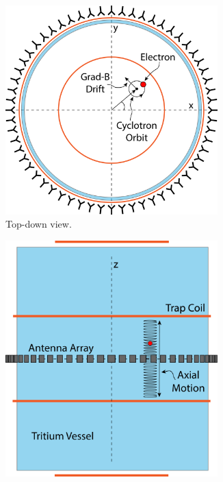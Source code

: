 \begin{figure}[h]
    \centering
    \begin{subfigure}{0.48\textwidth}
        \centering
        \includegraphics[width=0.9\textwidth]{figs/Chapter-4/230328_deepfilter_paper_apparatus_concept_top_v2.png}
        \caption{Top-down view.}
        \label{fig:apparatus_concept_top}
    \end{subfigure}
    \begin{subfigure}{0.48\textwidth}
        \centering
        \includegraphics[width=0.9\textwidth]{figs/Chapter-4/230328_deepfilter_paper_apparatus_concept_side_v2.png}

\end{subfigure}
\end{figure}
